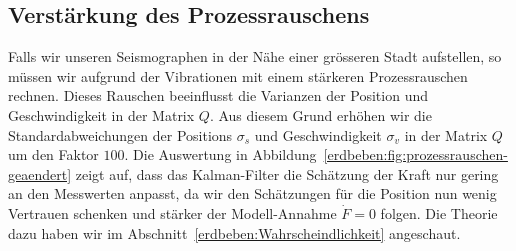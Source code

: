 \subsection{Verstärkung des Prozessrauschens}
Falls wir unseren Seismographen in der Nähe einer grösseren Stadt aufstellen, so müssen wir aufgrund der Vibrationen mit einem stärkeren Prozessrauschen rechnen.
Dieses Rauschen beeinflusst die Varianzen der Position und Geschwindigkeit in der Matrix $Q$.
Aus diesem Grund erhöhen wir die Standardabweichungen der Positions $\sigma_s$ und Geschwindigkeit $\sigma_v$ in der Matrix $Q$ um den Faktor $100$.
Die Auswertung in Abbildung~\ref{erdbeben:fig:prozessrauschen-geaendert} zeigt auf,
dass das Kalman-Filter die Schätzung der Kraft nur gering an den Messwerten anpasst,
da wir den Schätzungen für die Position nun wenig Vertrauen schenken und stärker der Modell-Annahme $\dot F = 0$ folgen.
Die Theorie dazu haben wir im Abschnitt~\ref{erdbeben:Wahrscheindlichkeit} angeschaut.

